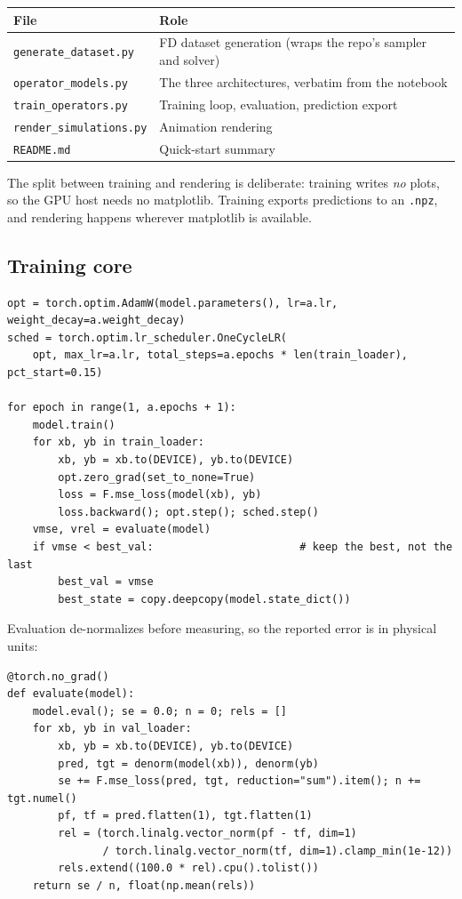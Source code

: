 \documentclass[11pt,a4paper]{article}
\begin{document}
\begin{center}
\small
\begin{tabular}{ll}
\toprule
\textbf{File} & \textbf{Role}\\
\midrule
\texttt{generate\_dataset.py}    & FD dataset generation (wraps the repo's sampler and solver)\\
\texttt{operator\_models.py}     & The three architectures, verbatim from the notebook\\
\texttt{train\_operators.py}     & Training loop, evaluation, prediction export\\
\texttt{render\_simulations.py}  & Animation rendering\\
\texttt{README.md}               & Quick-start summary\\
\bottomrule
\end{tabular}
\end{center}

The split between training and rendering is deliberate: training writes
\emph{no} plots, so the GPU host needs no matplotlib. Training exports
predictions to an \texttt{.npz}, and rendering happens wherever matplotlib is
available.

\subsection{Training core}

\begin{lstlisting}
opt = torch.optim.AdamW(model.parameters(), lr=a.lr, weight_decay=a.weight_decay)
sched = torch.optim.lr_scheduler.OneCycleLR(
    opt, max_lr=a.lr, total_steps=a.epochs * len(train_loader), pct_start=0.15)

for epoch in range(1, a.epochs + 1):
    model.train()
    for xb, yb in train_loader:
        xb, yb = xb.to(DEVICE), yb.to(DEVICE)
        opt.zero_grad(set_to_none=True)
        loss = F.mse_loss(model(xb), yb)
        loss.backward(); opt.step(); sched.step()
    vmse, vrel = evaluate(model)
    if vmse < best_val:                       # keep the best, not the last
        best_val = vmse
        best_state = copy.deepcopy(model.state_dict())
\end{lstlisting}

Evaluation de-normalizes before measuring, so the reported error is in physical
units:

\begin{lstlisting}
@torch.no_grad()
def evaluate(model):
    model.eval(); se = 0.0; n = 0; rels = []
    for xb, yb in val_loader:
        xb, yb = xb.to(DEVICE), yb.to(DEVICE)
        pred, tgt = denorm(model(xb)), denorm(yb)
        se += F.mse_loss(pred, tgt, reduction="sum").item(); n += tgt.numel()
        pf, tf = pred.flatten(1), tgt.flatten(1)
        rel = (torch.linalg.vector_norm(pf - tf, dim=1)
               / torch.linalg.vector_norm(tf, dim=1).clamp_min(1e-12))
        rels.extend((100.0 * rel).cpu().tolist())
    return se / n, float(np.mean(rels))
\end{lstlisting}
\end{document}
